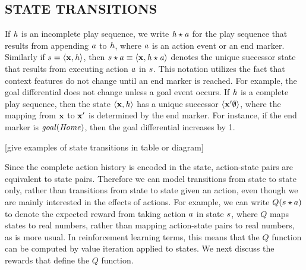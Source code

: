 \documentclass[]{article}
\begin{document}
\subsection{STATE TRANSITIONS}

If $\it{h}$ is an incomplete play sequence, we write $\it{h} \star a$ for the play sequence that results from appending $a$ to $\it{h}$, where $a$ is an action event or an end marker. Similarly if $s = \langle \mathbf{x}, \it{h} \rangle$, then $s \star a \equiv \langle \mathbf{x}, \it{h} \star a \rangle$ denotes the unique successor state that results from executing action $a$ in  $s$. This notation utilizes the fact that context features do not change until an end marker is reached. For example, the goal differential does not change unless a goal event occurs. If $\it{h}$ is a complete play sequence, then the state $\langle \mathbf{x}, \it{h} \rangle$ has a  unique successor $\langle \mathbf{x}' \emptyset \rangle$, where the mapping from $\mathbf{x}$ to $\mathbf{x}'$ is determined by the end marker. For instance, if the end marker is $\it{goal}(Home)$, then the goal differential increases by 1.

[give examples of state transitions in table or diagram]

Since the complete action history is encoded in the state, action-state pairs are equivalent to state pairs. Therefore we can model transitions from state to state only, rather than transitions from state to state given an action, even though we are mainly interested in the effects of actions. For example, we can write $Q(s \star a)$ to denote the expected reward from taking action $a$ in state $s$, where $Q$ maps states to real numbers, rather than mapping action-state pairs to real numbers, as is more usual. In reinforcement learning terms, this means that the $Q$ function can be computed by value iteration applied to states. We next discuss the rewards that define the $Q$ function.



%
%
%
\end{document}
